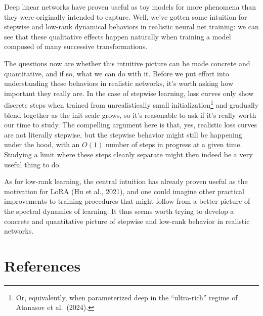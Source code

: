 \documentclass[12pt]{article}
\begin{document}
Deep linear networks have proven useful as toy models for more phenomena than they were originally intended to capture. Well, we've gotten some intuition for stepwise and low-rank dynamical behaviors in realistic neural net training: we can see that these qualitative effects happen naturally when training a model composed of many successive transformations.

The questions now are whether this intuitive picture can be made concrete and quantitative, and if so, what we can do with it. Before we put effort into understanding these behaviors in realistic networks, it's worth asking how important they really are. In the case of stepwise learning, loss curves only show discrete steps when trained from unrealistically small initialization\footnote{Or, equivalently, when parameterized deep in the ``ultra-rich'' regime of Atanasov et al.\ (2024).} and gradually blend together as the init scale grows, so it's reasonable to ask if it's really worth our time to study. The compelling argument here is that, yes, realistic loss curves are not literally stepwise, but the stepwise behavior might still be happening under the hood, with an $O(1)$ number of steps in progress at a given time. Studying a limit where these steps cleanly separate might then indeed be a very useful thing to do.

As for low-rank learning, the central intuition has already proven useful as the motivation for LoRA (Hu et al., 2021), and one could imagine other practical improvements to training procedures that might follow from a better picture of the spectral dynamics of learning. It thus seems worth trying to develop a concrete and quantitative picture of stepwise and low-rank behavior in realistic networks.

\section*{References}
\end{document}
